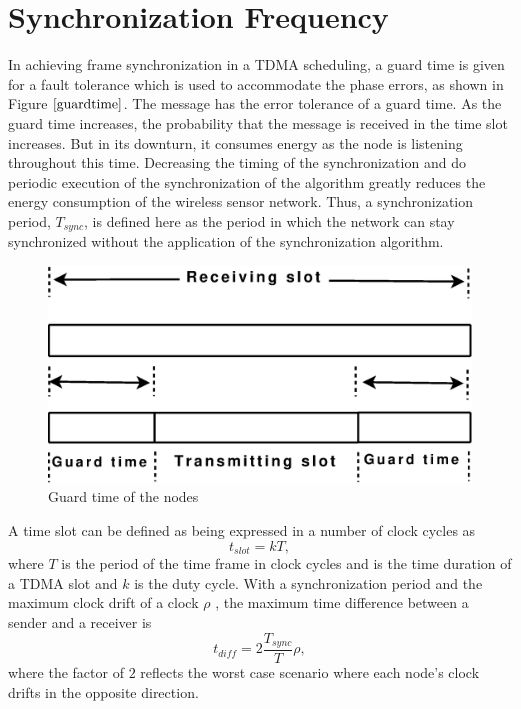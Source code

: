 \documentclass[a4paper,10pt]{report}
\begin{document}
\section{\textbf{Synchronization Frequency}}
In achieving frame synchronization in a TDMA scheduling, a guard time is given for a fault tolerance which is used to accommodate the
phase errors, as shown in Figure $\ref{guardtime}$. The message has the error tolerance of a guard time. As the guard time increases,
the probability that the message is received in the time slot increases. But in its downturn, it consumes energy as the node is
listening throughout this time.
\newline Decreasing the timing of the synchronization and do periodic execution of the synchronization of the algorithm greatly reduces
the energy consumption of the wireless sensor network. Thus, a synchronization period, $T_{sync}$, is defined here as the period in which the network can stay synchronized without the application of the synchronization algorithm.
\begin{figure}
\centering
\includegraphics[width=0.6 \textwidth]{guardtime}
\caption{Guard time of the nodes} \label{guardtime}
\end{figure}
\newline
A time slot can be defined as being expressed in a number of clock cycles as
\begin{equation}
t_{slot} = kT ,
\end{equation}
where $T$ is the period of the time frame in clock cycles and  is the time duration of a TDMA slot and $k$ is the duty
cycle.
\newline
With a synchronization period  and the maximum clock drift of a clock $\rho$ , the maximum time difference between a sender and a receiver is
\begin{equation}
t_{diff} = 2\frac{T_{sync}}{T}\rho ,
\end{equation}
where the factor of $2$ reflects the worst case scenario where each node's clock drifts in the opposite direction.
\end{document}
